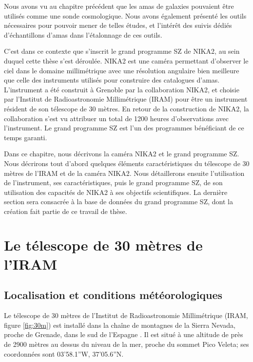 Nous avons vu au chapitre précédent que les amas de galaxies pouvaient être utilisés comme une sonde cosmologique.
Nous avons également présenté les outils nécessaires pour pouvoir mener de telles études, et l'intérêt des suivis dédiés d'échantillons d'amas dans l'étalonnage de ces outils.

C'est dans ce contexte que s'inscrit le grand programme SZ de NIKA2, au sein duquel cette thèse s'est déroulée.
NIKA2 est une caméra permettant d'observer le ciel dans le domaine millimétrique avec une résolution angulaire bien meilleure que celle des instruments utilisés pour construire des catalogues d'amas.
L'instrument a été construit à Grenoble par la collaboration NIKA2, et choisie par l'Institut de Radioastronomie Millimétrique (IRAM) pour être un instrument résident de son télescope de 30 mètres.
En retour de la construction de NIKA2, la collaboration s'est vu attribuer un total de 1200 heures d'observations avec l'instrument.
Le grand programme SZ est l'un des programmes bénéficiant de ce temps garanti.

Dans ce chapitre, nous décrivons la caméra NIKA2 et le grand programme SZ.
Nous décrirons tout d'abord quelques éléments caractéristiques du télescope de 30 mètres de l'IRAM et de la caméra NIKA2.
Nous détaillerons ensuite l'utilisation de l'instrument, ses caractéristiques, puis le grand programme SZ, de son utilisation des capacités de NIKA2 à ses objectifs scientifiques.
La dernière section sera consacrée à la base de données du grand programme SZ, dont la création fait partie de ce travail de thèse.

\section{Le télescope de 30 mètres de l'IRAM}\label{sec:30m}

\subsection{Localisation et conditions météorologiques}\label{sec:30m_geo}

Le télescope de 30 mètres de l'Institut de Radioastronomie Millimétrique (IRAM, figure \ref{fig:30m}) est installé dans la chaîne de montagnes de la Sierra Nevada, proche de Grenade, dans le sud de l'Espagne \cite{baars_iram_1987}.
Il est situé à une altitude de près de 2900 mètres au dessus du niveau de la mer, proche du sommet Pico Veleta; ses coordonnées sont 03'58.1''W, 37'05.6''N.

